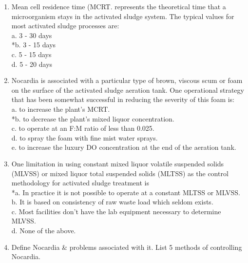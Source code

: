 \begin{enumerate}
\item Mean cell residence time (MCRT. represents the theoretical time that a microorganism stays in the  activated sludge system. The typical values for most activated sludge processes are: \\
a. 3 - 30 days \\
*b. 3 - 15 days \\
c. 5 - 15 days \\
d. 5 - 20 days \\

\item Nocardia is associated with a particular type of brown, viscous scum or foam on the surface of the activated sludge aeration tank. One operational strategy that has been somewhat successful in reducing the severity of this foam is: \\
a. to increase the plant's MCRT. \\
*b. to decrease the plant's mixed liquor concentration. \\
c. to operate at an F:M ratio of less than 0.025. \\
d. to spray the foam with fine mist water sprays. \\
e. to increase the luxury DO concentration at the end of the aeration tank. \\

\item One limitation in using constant mixed liquor volatile suspended solids (MLVSS) or mixed liquor total suspended solids (MLTSS) as the control methodology for activated sludge treatment is \\
*a. In practice it is not possible to operate at a constant MLTSS or MLVSS. \\
b. It is based on consistency of raw waste load which seldom exists. \\
c. Most facilities don't have the lab equipment necessary to determine MLVSS. \\
d. None of the above. \\

\item Define Nocardia \& problems associated with it.   List 5 methods of controlling Nocardia.\\


\end{enumerate}
